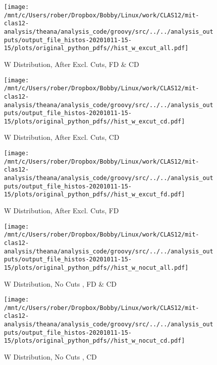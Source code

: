 \documentclass{article}
\begin{document}
\begin{landscape}
\begin{figure}[h]
        \texttt{[image: /mnt/c/Users/rober/Dropbox/Bobby/Linux/work/CLAS12/mit-clas12-analysis/theana/analysis\_code/groovy/src/../../analysis\_outputs/output\_file\_histos-20201011-15-15/plots/original\_python\_pdfs//hist\_w\_excut\_all.pdf]}
        \captionsetup{textformat=empty,labelformat=blank}
        \caption{W Distribution, After Excl. Cuts, FD \& CD}
    \end{figure}
    \clearpage
    
    \begin{figure}[h]
        \centering

        \texttt{[image: /mnt/c/Users/rober/Dropbox/Bobby/Linux/work/CLAS12/mit-clas12-analysis/theana/analysis\_code/groovy/src/../../analysis\_outputs/output\_file\_histos-20201011-15-15/plots/original\_python\_pdfs//hist\_w\_excut\_cd.pdf]}
        \captionsetup{textformat=empty,labelformat=blank}
        \caption{W Distribution, After Excl. Cuts, CD}
    \end{figure}
    \clearpage
    
    \begin{figure}[h]
        \centering

        \texttt{[image: /mnt/c/Users/rober/Dropbox/Bobby/Linux/work/CLAS12/mit-clas12-analysis/theana/analysis\_code/groovy/src/../../analysis\_outputs/output\_file\_histos-20201011-15-15/plots/original\_python\_pdfs//hist\_w\_excut\_fd.pdf]}
        \captionsetup{textformat=empty,labelformat=blank}
        \caption{W Distribution, After Excl. Cuts, FD}
    \end{figure}
    \clearpage
    
    \begin{figure}[h]
        \centering

        \texttt{[image: /mnt/c/Users/rober/Dropbox/Bobby/Linux/work/CLAS12/mit-clas12-analysis/theana/analysis\_code/groovy/src/../../analysis\_outputs/output\_file\_histos-20201011-15-15/plots/original\_python\_pdfs//hist\_w\_nocut\_all.pdf]}
        \captionsetup{textformat=empty,labelformat=blank}
        \caption{W Distribution, No Cuts , FD \& CD}
    \end{figure}
    \clearpage
    
    \begin{figure}[h]
        \centering

        \texttt{[image: /mnt/c/Users/rober/Dropbox/Bobby/Linux/work/CLAS12/mit-clas12-analysis/theana/analysis\_code/groovy/src/../../analysis\_outputs/output\_file\_histos-20201011-15-15/plots/original\_python\_pdfs//hist\_w\_nocut\_cd.pdf]}
        \captionsetup{textformat=empty,labelformat=blank}
        \caption{W Distribution, No Cuts , CD}
    \end{figure}
    \clearpage
    

\end{landscape}
\end{document}
